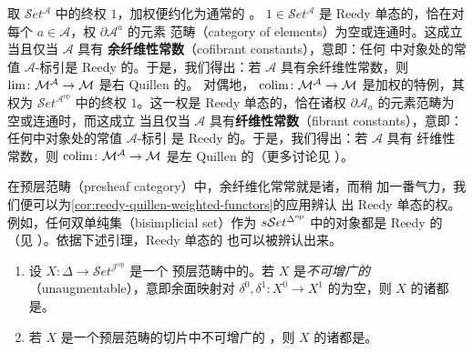 \begin{example}[同伦极限与同伦余极限]\label{exa:homotopy-limits-colimits}
取 $\mathcal{S}et^{\mathcal{A}}$ 中的终权 $1$，加权\trLimit{}便约化为通常的%
\trLimit{}\trFunctor。\trFunctor{} $1\in\mathcal{S}et^{\mathcal{A}}$ 是 Reedy
单态的，恰在对每个 $a\in\mathcal{A}$，权 $\partial\mathcal{A}^{a}$ 的元素
范畴（category of elements）为空或连通时。这成立当且仅当 $\mathcal{A}$ 具有
\textbf{余纤维性常数}（cofibrant constants），意即：任何\trModelCategory{}%
中\trCofibrant{}对象处的常值 $\mathcal{A}$-标引\trDiagram{}是 Reedy
\trCofibrant{}的。于是，我们得出：若 $\mathcal{A}$ 具有余纤维性常数，则%
\trLimit{}\trFunctor{} $\operatorname{lim}\colon\mathcal{M}^{\mathcal{A}}\to\mathcal{M}$
是右 Quillen 的。
对偶地，\trColimit{}\trFunctor{} $\operatorname{colim}\colon\mathcal{M}^{\mathcal{A}}\to\mathcal{M}$
是加权\trColimit{}\trFunctor{}的特例，其权为
$\mathcal{S}et^{\mathcal{A}^{\mathrm{op}}}$ 中的终权 $1$。这一权是 Reedy
单态的，恰在诸权 $\partial\mathcal{A}_a$ 的元素范畴为空或连通时，而这成立
当且仅当 $\mathcal{A}$ 具有\textbf{纤维性常数}（fibrant constants），意即：
任何\trModelCategory{}中\trFibrant{}对象处的常值 $\mathcal{A}$-标引%
\trDiagram{}是 Reedy \trFibrant{}的。于是，我们得出：若 $\mathcal{A}$ 具有
纤维性常数，则\trColimit{}\trFunctor{} $\operatorname{colim}\colon\mathcal{M}^{\mathcal{A}}\to\mathcal{M}$
是左 Quillen 的（更多讨论见 \cite[\S9]{bib107}）。
\end{example}

在预层范畴（presheaf category）中，余纤维化常常就是诸\trMonomorphism，而稍
加一番气力，我们便可以为\cref{cor:reedy-quillen-weighted-functors}的应用辨认
出 Reedy 单态的权。例如，任何双单纯集（bisimplicial set）作为
$s\mathcal{S}et^{\Delta^{\mathrm{op}}}$ 中的对象都是 Reedy \trCofibrant{}的（见
\cite[14.3.7]{bib103}）。依据下述引理，Reedy 单态的\trCosimplicialObject{}%
也可以被辨认出来。

\begin{lemma}\label{lem:unaugmentable-cosimplicial}
\begin{enumerate}[label=(\roman*)]
\item 设 $X\colon\Delta\to\mathcal{S}et^{\mathcal{J}^{\mathrm{op}}}$ 是一个
  预层范畴中的\trCosimplicialObject。若 $X$ 是\emph{不可增广的}
（unaugmentable），意即余面映射对 $\delta^{0},\delta^{1}\colon X^{0}\to X^{1}$
的\trEqualizer{}为空，则 $X$ 的诸\trLatchingMap{}都是\trMonomorphism。
\item 若 $X$ 是一个预层范畴的切片\trCategory{}中不可增广的%
  \trCosimplicialObject，则 $X$ 的诸\trLatchingMap{}都是\trMonomorphism。
\end{enumerate}
\end{lemma}

